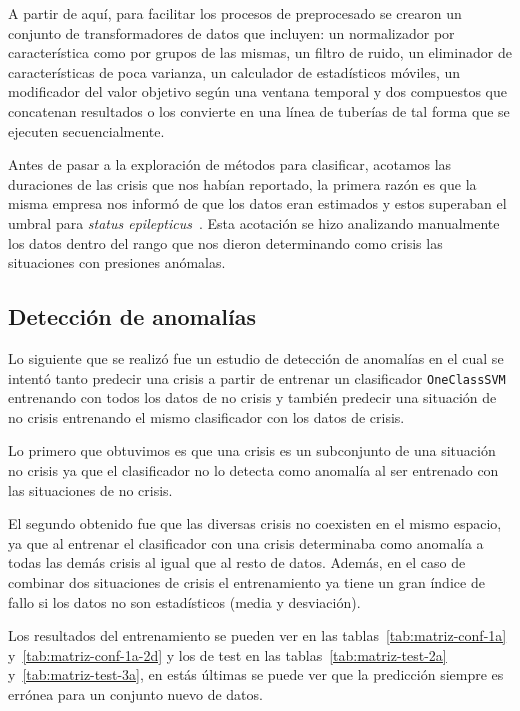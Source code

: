 A partir de aquí, para facilitar los procesos de preprocesado se crearon un conjunto de transformadores de datos que incluyen: un normalizador por característica como por grupos de las mismas, un filtro de ruido, un eliminador de características de poca varianza, un calculador de estadísticos móviles, un modificador del valor objetivo según una ventana temporal y dos compuestos que concatenan resultados o los convierte en una línea de tuberías de tal forma que se ejecuten secuencialmente.

Antes de pasar a la exploración de métodos para clasificar, acotamos las duraciones de las crisis que nos habían reportado, la primera razón es que la misma empresa nos informó de que los datos eran estimados y estos superaban el umbral para \textit{status epilepticus}~\cite{epilepsia}. Esta acotación se hizo analizando manualmente los datos dentro del rango que nos dieron determinando como crisis las situaciones con presiones anómalas. 

\subsection{Detección de anomalías}
Lo siguiente que se realizó fue un estudio de detección de anomalías en el cual se intentó tanto predecir una crisis a partir de entrenar un clasificador \texttt{OneClassSVM} entrenando con todos los datos de no crisis y también predecir una situación de no crisis entrenando el mismo clasificador con los datos de crisis.

Lo primero que obtuvimos es que una crisis es un subconjunto de una situación no crisis ya que el clasificador no lo detecta como anomalía al ser entrenado con las situaciones de no crisis.

El segundo obtenido fue que las diversas crisis no coexisten en el mismo espacio, ya que al entrenar el clasificador con una crisis determinaba como anomalía a todas las demás crisis al igual que al resto de datos. Además, en el caso de combinar dos situaciones de crisis el entrenamiento ya tiene un gran índice de fallo si los datos no son estadísticos (media y desviación).

Los resultados del entrenamiento se pueden ver en las tablas~\ref{tab:matriz-conf-1a} y~\ref{tab:matriz-conf-1a-2d} y los de test en las tablas~\ref{tab:matriz-test-2a} y~\ref{tab:matriz-test-3a}, en estás últimas se puede ver que la predicción siempre es errónea para un conjunto nuevo de datos.


